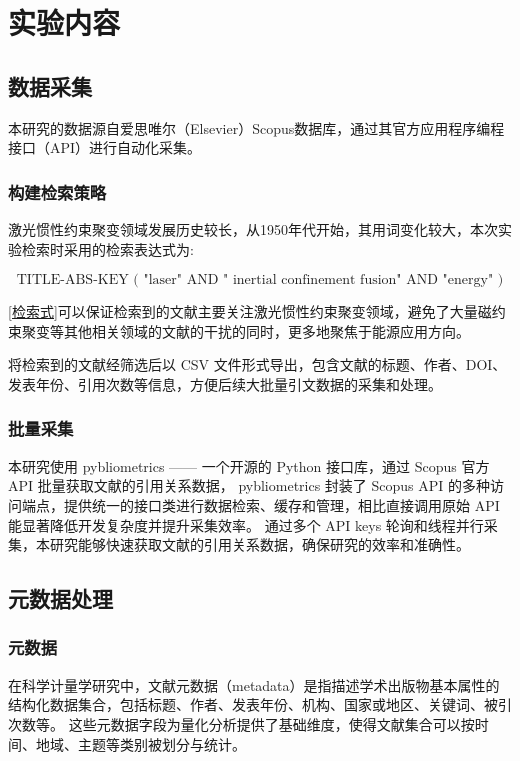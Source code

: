 \documentclass[12pt,hyperref,a4paper,UTF8]{ctexart}
\begin{document}
\section{实验内容}
    \subsection{数据采集}
    本研究的数据源自爱思唯尔（Elsevier）Scopus数据库，通过其官方应用程序编程接口（API）进行自动化采集。
        
        \subsubsection{构建检索策略}
        激光惯性约束聚变领域发展历史较长，从1950年代开始，其用词变化较大，本次实验检索时采用的检索表达式为: 
            
            \begin{equation}
                \text{TITLE-ABS-KEY ( "laser" AND " inertial confinement fusion" AND "energy" )}
                \label{检索式}
            \end{equation}

        \autoref{检索式}可以保证检索到的文献主要关注激光惯性约束聚变领域，避免了大量磁约束聚变等其他相关领域的文献的干扰的同时，更多地聚焦于能源应用方向。

        将检索到的文献经筛选后以 CSV 文件形式导出，包含文献的标题、作者、DOI、发表年份、引用次数等信息，方便后续大批量引文数据的采集和处理。

        \subsubsection{批量采集}
        本研究使用 pybliometrics —— 一个开源的 Python 接口库，通过 Scopus 官方 API 批量获取文献的引用关系数据，
        pybliometrics 封装了 Scopus API 的多种访问端点，提供统一的接口类进行数据检索、缓存和管理，相比直接调用原始 API 能显著降低开发复杂度并提升采集效率。
        通过多个 API keys 轮询和线程并行采集，本研究能够快速获取文献的引用关系数据，确保研究的效率和准确性。

    \subsection{元数据处理}

        \subsubsection{元数据}
        在科学计量学研究中，文献元数据（metadata）是指描述学术出版物基本属性的结构化数据集合，包括标题、作者、发表年份、机构、国家或地区、关键词、被引次数等\cite{singh2024exploring}。
        这些元数据字段为量化分析提供了基础维度，使得文献集合可以按时间、地域、主题等类别被划分与统计。
        
\end{document}

